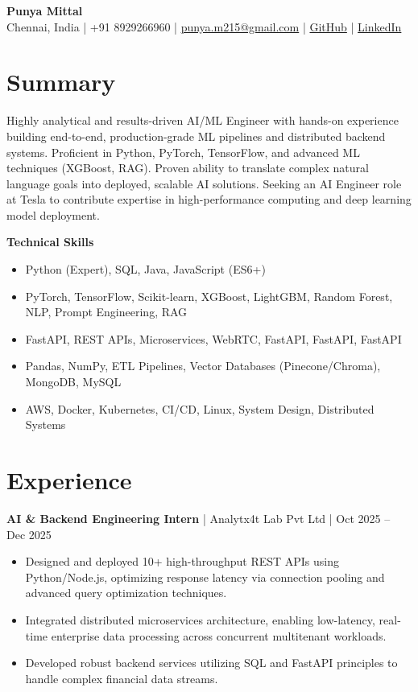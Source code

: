 \documentclass[10pt, letterpaper]{article}
\newcommand{\contactinfo}[1]{
    \centering
    \textbf{\Huge Punya Mittal} \\
    \vspace{2pt}
    \small #1
    \vspace{5pt}
}
\newenvironment{skillslist}{
    \vspace{2pt}
    \textbf{Technical Skills} \\
    \vspace{-4pt}
    \begin{itemize}[leftmargin=*, itemsep=1pt, parsep=0pt]
}{
    \end{itemize}
}
\begin{document}
\contactinfo{
    Chennai, India | +91 8929266960 | \href{mailto:punya.m215@gmail.com}{punya.m215@gmail.com} | 
    \href{https://github.com/yourusername}{GitHub} | \href{https://linkedin.com/in/yourprofile}{LinkedIn}
}

\section{Summary}
\noindent Highly analytical and results-driven AI/ML Engineer with hands-on experience building end-to-end, production-grade ML pipelines and distributed backend systems. Proficient in Python, PyTorch, TensorFlow, and advanced ML techniques (XGBoost, RAG). Proven ability to translate complex natural language goals into deployed, scalable AI solutions. Seeking an AI Engineer role at Tesla to contribute expertise in high-performance computing and deep learning model deployment.

\begin{skillslist}
    \item[\textbf{Languages}] Python (Expert), SQL, Java, JavaScript (ES6+)
    \item[\textbf{ML Frameworks}] PyTorch, TensorFlow, Scikit-learn, XGBoost, LightGBM, Random Forest, NLP, Prompt Engineering, RAG
    \item[\textbf{Backend & Web}] FastAPI, REST APIs, Microservices, WebRTC, FastAPI, FastAPI, FastAPI
    \item[\textbf{Data & Databases}] Pandas, NumPy, ETL Pipelines, Vector Databases (Pinecone/Chroma), MongoDB, MySQL
    \item[\textbf{Infrastructure}] AWS, Docker, Kubernetes, CI/CD, Linux, System Design, Distributed Systems
\end{skillslist}

\section{Experience}

\textbf{AI & Backend Engineering Intern} | Analytx4t Lab Pvt Ltd | Oct 2025 – Dec 2025
\begin{itemize}[leftmargin=*, itemsep=2pt]
    \item Designed and deployed 10+ high-throughput REST APIs using Python/Node.js, optimizing response latency via connection pooling and advanced query optimization techniques.
    \item Integrated distributed microservices architecture, enabling low-latency, real-time enterprise data processing across concurrent multitenant workloads.
    \item Developed robust backend services utilizing SQL and FastAPI principles to handle complex financial data streams.
\end{itemize}
\end{document}
